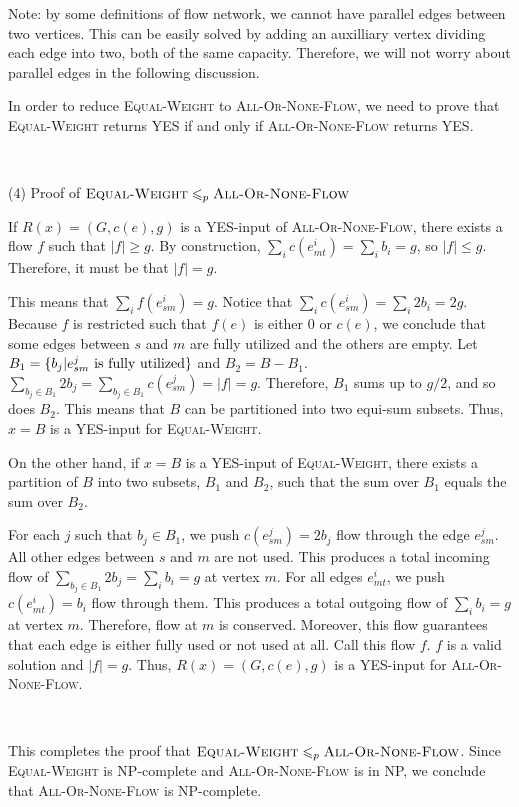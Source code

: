 \documentclass{article}
\begin{document}
Note: by some definitions of flow network, we cannot have parallel edges between two vertices. This can be easily solved by adding an auxilliary vertex dividing each edge into two, both of the same capacity. Therefore, we will not worry about parallel edges in the following discussion.

In order to reduce \textsc{Equal-Weight} to \textsc{All-Or-None-Flow}, we need to prove that \textsc{Equal-Weight} returns YES if and only if \textsc{All-Or-None-Flow} returns YES.

~

\noindent(4) Proof of $\textsc{Equal-Weight}\leqslant_p\textsc{All-Or-None-Flow}$

If $R(x)=(G,c(e),g)$ is a YES-input of \textsc{All-Or-None-Flow}, there exists a flow $f$ such that $|f|\geqslant g$. By construction, $\sum_ic(e_{mt}^i)=\sum_ib_i=g$, so $|f|\leqslant g$. Therefore, it must be that $|f|=g$.

This means that $\sum_if(e_{sm}^i)=g$. Notice that $\sum_ic(e_{sm}^i)=\sum_i2b_i=2g$. Because $f$ is restricted such that $f(e)$ is either 0 or $c(e)$, we conclude that some edges between $s$ and $m$ are fully utilized and the others are empty. Let $B_1=\{b_j|e_{sm}^j\textup{ is fully utilized}\}$ and $B_2=B-B_1$. $\sum_{b_j\in B_1}2b_j=\sum_{b_j\in B_1}c(e_{sm}^j)=|f|=g$. Therefore, $B_1$ sums up to $g/2$, and so does $B_2$. This means that $B$ can be partitioned into two equi-sum subsets. Thus, $x=B$ is a YES-input for \textsc{Equal-Weight}.

On the other hand, if $x=B$ is a YES-input of \textsc{Equal-Weight}, there exists a partition of $B$ into two subsets, $B_1$ and $B_2$, such that the sum over $B_1$ equals the sum over $B_2$.

For each $j$ such that $b_j\in B_1$, we push $c(e_{sm}^j)=2b_j$ flow through the edge $e_{sm}^j$. All other edges between $s$ and $m$ are not used. This produces a total incoming flow of $\sum_{b_j\in B_1}2b_j=\sum_ib_i=g$ at vertex $m$. For all edges $e_{mt}^i$, we push $c(e_{mt}^i)=b_i$ flow through them. This produces a total outgoing flow of $\sum_ib_i=g$ at vertex $m$. Therefore, flow at $m$ is conserved. Moreover, this flow guarantees that each edge is either fully used or not used at all. Call this flow $f$. $f$ is a valid solution and $|f|=g$. Thus, $R(x)=(G,c(e),g)$ is a YES-input for \textsc{All-Or-None-Flow}.

~

This completes the proof that $\textsc{Equal-Weight}\leqslant_p\textsc{All-Or-None-Flow}$. Since \textsc{Equal-Weight} is NP-complete and \textsc{All-Or-None-Flow} is in NP, we conclude that \textsc{All-Or-None-Flow} is NP-complete.
\end{document}

